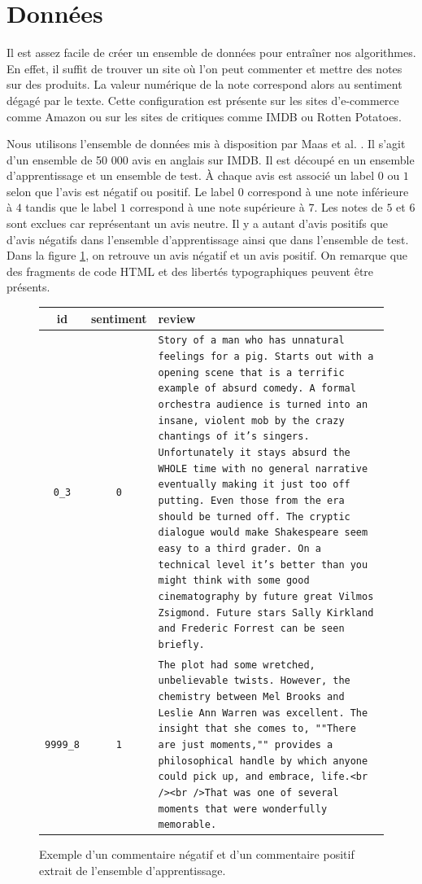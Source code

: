 \documentclass{article}
\begin{document}
\section{Données}

Il est assez facile de créer un ensemble de données pour entraîner nos algorithmes. En effet, il suffit de trouver un site où l'on peut commenter et mettre des notes sur des produits. La valeur numérique de la note correspond alors au sentiment dégagé par le texte. Cette configuration est présente sur les sites d'e-commerce comme Amazon ou sur les sites de critiques comme IMDB ou Rotten Potatoes.


Nous utilisons l'ensemble de données mis à disposition par Maas et al. \cite{maas-EtAl:2011:ACL-HLT2011}. Il s'agit d'un ensemble de 50 000 avis en anglais sur IMDB. Il est découpé en un ensemble d'apprentissage et un ensemble de test. À chaque avis est associé un label $0$ ou $1$ selon que l'avis est négatif ou positif. Le label $0$ correspond à une note inférieure à $4$ tandis que le label $1$ correspond à une note supérieure à $7$. Les notes de $5$ et $6$ sont exclues car représentant un avis neutre. Il y a autant d'avis positifs que d'avis négatifs dans l'ensemble d'apprentissage ainsi que dans l'ensemble de test. Dans la figure \ref{example_imdb}, on retrouve un avis négatif et un avis positif. On remarque que des fragments de code HTML et des libertés typographiques peuvent être présents.

\begin{figure}[h]
\begin{center}
\begin{tabular}{|c|c|p{80mm}|}
	\hline
	id & sentiment & review \\
	\hline
	\texttt{0\_3} & \texttt{0} & \texttt{Story of a man who has unnatural feelings for a pig. Starts out with a opening scene that is a terrific example of absurd comedy. A formal orchestra audience is turned into an insane, violent mob by the crazy chantings of it's singers. Unfortunately it stays absurd the WHOLE time with no general narrative eventually making it just too off putting. Even those from the era should be turned off. The cryptic dialogue would make Shakespeare seem easy to a third grader. On a technical level it's better than you might think with some good cinematography by future great Vilmos Zsigmond. Future stars Sally Kirkland and Frederic Forrest can be seen briefly.} \\
	\hline
	\texttt{9999\_8} & \texttt{1} & \texttt{The plot had some wretched, unbelievable twists. However, the chemistry between Mel Brooks and Leslie Ann Warren was excellent. The insight that she comes to, ""There are just moments,"" provides a philosophical handle by which anyone could pick up, and embrace, life.<br /><br />That was one of several moments that were wonderfully memorable.} \\
	\hline
\end{tabular}
\caption{Exemple d'un commentaire négatif et d'un commentaire positif extrait de l'ensemble d'apprentissage.}
\label{example_imdb}
\end{center}
\end{figure}
\end{document}
